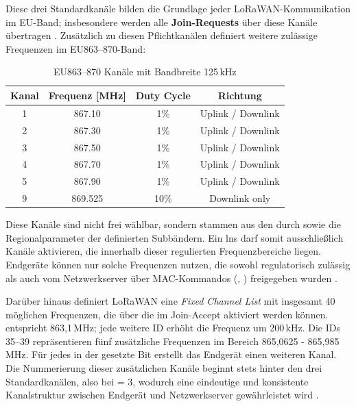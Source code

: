 	Diese drei Standardkanäle bilden die Grundlage jeder LoRaWAN-Kommunikation im EU-Band; insbesondere werden alle \textbf{Join-Requests} über diese Kanäle übertragen \cite{LoRaAlliance:2022}. Zusätzlich zu diesen Pflichtkanälen definiert \textcite{ETSI:2018} weitere zulässige Frequenzen im EU863--870-Band:

	\begin{table}[H]
		\centering
		\begin{tabular}{|c|c|c|c|}
			\hline
			\textbf{Kanal} & \textbf{Frequenz [MHz]} & \textbf{Duty Cycle} & \textbf{Richtung} \\
			\hline
			1 & 867.10  & 1\%  & Uplink / Downlink \\
			\hline
			2 & 867.30  & 1\%  & Uplink / Downlink \\
			\hline
			3 & 867.50  & 1\%  & Uplink / Downlink \\
			\hline
			4 & 867.70  & 1\%  & Uplink / Downlink \\
			\hline
			5 & 867.90  & 1\%  & Uplink / Downlink \\
			\hline
			9 & 869.525 & 10\% & Downlink only \\
			\hline
		\end{tabular}
		\caption{EU863--870 Kanäle mit Bandbreite 125\,kHz \cite[Kap.~7.2.1]{ETSI:2018}}
		\label{tab:eu868channels125}
	\end{table}

	Diese Kanäle sind nicht frei wählbar, sondern stammen aus den durch \textcite{ETSI:2018} sowie die Regionalparameter der \textcite{LoRaAlliance:2022} definierten Subbändern. Ein \ac{lns} darf somit ausschlie{\ss}lich Kanäle aktivieren, die innerhalb dieser regulierten Frequenzbereiche liegen. Endgeräte können nur solche Frequenzen nutzen, die sowohl regulatorisch zulässig als auch vom Netzwerkserver über MAC-Kommandos (, ) freigegeben wurden \cite{LoRaAlliance:2020b, LoRaAlliance:2022}.


	Darüber hinaus definiert LoRaWAN eine \textit{Fixed Channel List} mit insgesamt 40 möglichen Frequenzen, die über die  im Join-Accept aktiviert werden können.  entspricht 863{,}1\,MHz; jede weitere ID erhöht die Frequenz um 200\,kHz. Die IDs 35--39 repräsentieren fünf zusätzliche Frequenzen im Bereich 865{,}0625 - 865{,}985\,MHz. Für jedes in der  gesetzte Bit erstellt das Endgerät einen weiteren Kanal. Die Nummerierung dieser zusätzlichen Kanäle beginnt stets hinter den drei Standardkanälen, also bei  = 3, wodurch eine eindeutige und konsistente Kanalstruktur zwischen Endgerät und Netzwerkserver gewährleistet wird \cite[30 - 31]{LoRaAlliance:2022} \cite[36]{LoRaAlliance:2020b}.


